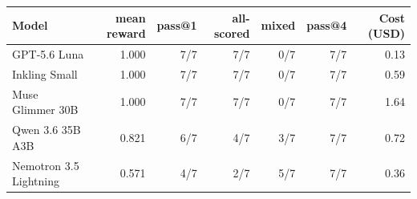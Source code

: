 \begin{tabular}{lrrrrrr}
\toprule
Model & mean reward & pass@1 & all-scored & mixed & pass@4 & Cost (USD) \\
\midrule
GPT-5.6 Luna & 1.000 & 7/7 & 7/7 & 0/7 & 7/7 & 0.13 \\
Inkling Small & 1.000 & 7/7 & 7/7 & 0/7 & 7/7 & 0.59 \\
Muse Glimmer 30B & 1.000 & 7/7 & 7/7 & 0/7 & 7/7 & 1.64 \\
Qwen 3.6 35B A3B & 0.821 & 6/7 & 4/7 & 3/7 & 7/7 & 0.72 \\
Nemotron 3.5 Lightning & 0.571 & 4/7 & 2/7 & 5/7 & 7/7 & 0.36 \\
\bottomrule
\end{tabular}
